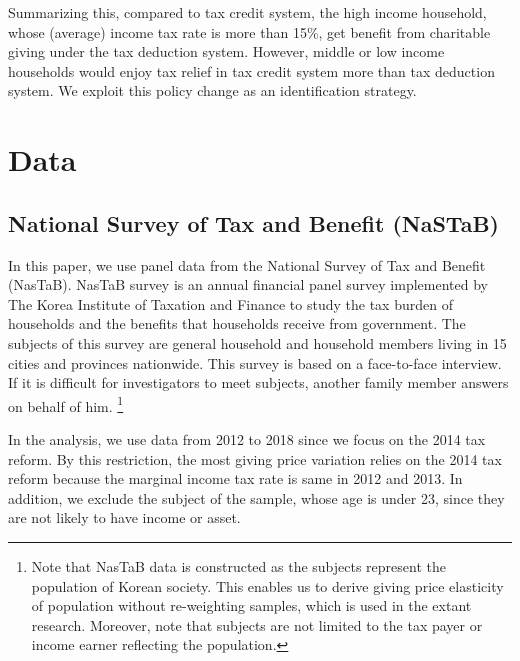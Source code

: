 \documentclass[
]{article}
\begin{document}
Summarizing this, compared to tax credit system, the high income household, whose (average) income tax rate is more than 15\%, get benefit from charitable giving under the tax deduction system. However, middle or low income households would enjoy tax relief in tax credit system more than tax deduction system. We exploit this policy change as an identification strategy.

\hypertarget{data}{%
\section{Data}\label{data}}

\hypertarget{national-survey-of-tax-and-benefit-nastab}{%
\subsection{National Survey of Tax and Benefit (NaSTaB)}\label{national-survey-of-tax-and-benefit-nastab}}

In this paper, we use panel data from the National Survey of Tax and Benefit (NasTaB).
NasTaB survey is an annual financial panel survey
implemented by The Korea Institute of Taxation and Finance
to study the tax burden of households and the benefits that households receive from government.
The subjects of this survey are general household and household members living in 15 cities
and provinces nationwide.
This survey is based on a face-to-face interview.
If it is difficult for investigators to meet subjects, another family member answers on behalf of him. \footnote{Note that NasTaB data is constructed as the subjects represent the population of Korean society. This enables us to derive giving price elasticity of population without re-weighting samples, which is used in the extant research. Moreover, note that subjects are not limited to the tax payer or income earner reflecting the population.}

In the analysis, we use data from 2012 to 2018 since
\color{red}
we focus on the 2014 tax reform.
By this restriction, the most giving price variation relies on the 2014 tax reform because
the marginal income tax rate is same in 2012 and 2013.
\color{black}
In addition, we exclude the subject of the sample, whose age is under 23, since they are not likely to have income or asset.
\end{document}

